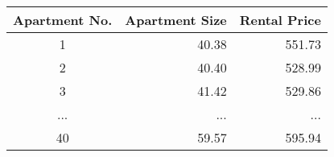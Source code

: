 \begin{tabular}{crr}
\toprule
Apartment No. & Apartment Size & Rental Price \\
\midrule
            1 &          40.38 &       551.73 \\
            2 &          40.40 &       528.99 \\
            3 &          41.42 &       529.86 \\
          ... &            ... &          ... \\
           40 &          59.57 &       595.94 \\
\bottomrule
\end{tabular}
